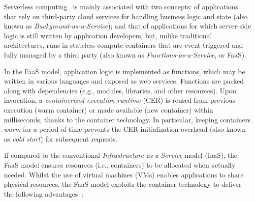 Serverless computing~\cite{Lloyd18serverless,Roberts:2018} is mainly associated with two concepts: of applications that rely on third-party cloud services for handling business logic and state (also known as \textit{Background-as-a-Service}); and that of applications for which server-side logic is still written by application developers, but, unlike traditional architectures, runs in stateless compute containers that are event-triggered
and fully managed by a third party (also known as \textit{Functions-as-a-Service}, or FaaS).

In the FaaS model, application logic is implemented as functions, which may be written in various languages and exposed as web services. Functions are packed along with dependencies (e.g., modules, libraries, and other resources). Upon invocation, a \textit{containerized execution runtime} (CER) is reused from previous execution (warm container) or made available (new container) within milliseconds, thanks to the container technology. In particular, keeping containers \textit{warm} for a period of time prevents the CER initialization overhead (also known as \textit{cold start}) for subsequent requests. 





If compared to the conventional \textit{Infrastructure-as-a-Service} model (IaaS), %
the FaaS model ensures resources (i.e., containers) to be allocated when actually needed. Whilst the use of virtual machines (VMs) enables applications to share physical resources, the FaaS model exploits the container technology to deliver the following advantages~\cite{GarrigaMendonca2017}:

